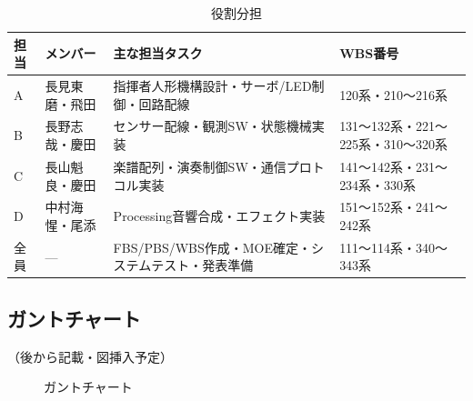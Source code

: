 \begin{table}[H]
  \centering
  \begin{tabularx}{\linewidth}{llXl}
    \toprule
    担当 & メンバー & 主な担当タスク & WBS番号 \\
    \midrule
    A & 長見東磨・飛田 & 指揮者人形機構設計・サーボ/LED制御・回路配線 & 120系・210〜216系 \\
    B & 長野志哉・慶田 & センサー配線・観測SW・状態機械実装 & 131〜132系・221〜225系・310〜320系 \\
    C & 長山魁良・慶田 & 楽譜配列・演奏制御SW・通信プロトコル実装 & 141〜142系・231〜234系・330系 \\
    D & 中村海惺・尾添 & Processing音響合成・エフェクト実装 & 151〜152系・241〜242系 \\
    全員 & — & FBS/PBS/WBS作成・MOE確定・システムテスト・発表準備 & 111〜114系・340〜343系 \\
    \bottomrule
  \end{tabularx}
  \caption{役割分担}
  \label{tab:roles}
\end{table}

\subsection{ガントチャート}

（後から記載・図挿入予定）

\begin{figure}[H]
  \centering
  \caption{ガントチャート}
  \label{fig:gantt}
\end{figure}
